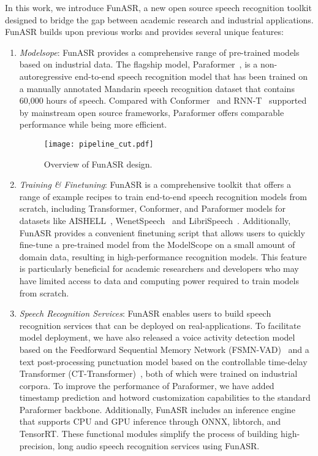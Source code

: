\documentclass{INTERSPEECH2023}
\begin{document}
In this work, we introduce FunASR, a new open source speech recognition toolkit designed to bridge the gap between academic research and industrial applications. FunASR builds upon previous works and provides several unique features:
\begin{enumerate}
    \item \emph{Modelsope}: FunASR provides a comprehensive range of pre-trained models based on industrial data. The flagship model, Paraformer~\cite{gao2022paraformer}, is a non-autoregressive end-to-end speech recognition model that has been trained on a manually annotated Mandarin speech recognition dataset that contains 60,000 hours of speech.  Compared with Conformer~\cite{gulati2020conformer} and RNN-T~\cite{graves2013speech} supported by mainstream open source frameworks, Paraformer offers comparable performance while being more efficient. 
\begin{figure}
    \centering
    \texttt{[image: pipeline\_cut.pdf]}
    \caption{Overview of FunASR design.}
    \label{fig:overview}
    \vspace{-8mm}
\end{figure}

    \item \emph{Training \& Finetuning}:  FunASR is a comprehensive toolkit that offers a range of example recipes to train end-to-end speech recognition models from scratch, including Transformer, Conformer, and Paraformer models for datasets like  AISHELL~\cite{bu2017aishell,du2018aishell}, WenetSpeech~\cite{zhang2022wenetspeech} and LibriSpeech~\cite{panayotov2015librispeech}. Additionally, FunASR provides a convenient finetuning script that allows users to quickly fine-tune a pre-trained model from the ModelScope on a small amount of domain data, resulting in high-performance recognition models. This feature is particularly beneficial for academic researchers and developers who may have limited access to data and computing power required to train models from scratch.

    \item \emph{Speech Recognition Services}: FunASR enables users to build speech recognition services that can be deployed on real-applications.
    To facilitate model deployment, we have also released a voice activity detection model based on the Feedforward Sequential Memory Network (FSMN-VAD)~\cite{zhang2018deep} and a text post-processing punctuation model based on the controllable time-delay Transformer (CT-Transformer)~\cite{chen2020controllable}, both of which were trained on industrial corpora. To improve the performance of Paraformer, we have added timestamp prediction and hotword customization capabilities to the standard Paraformer backbone. Additionally, FunASR includes an inference engine that supports CPU and GPU inference through ONNX, libtorch, and TensorRT. These functional modules simplify the process of building high-precision, long audio speech recognition services using FunASR.
\end{enumerate}
\end{document}
